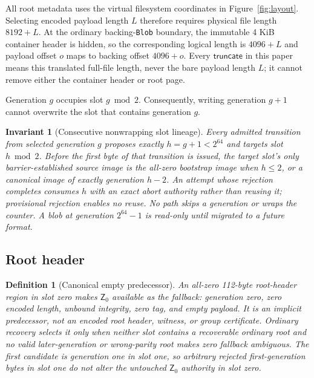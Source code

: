\documentclass[10pt,twocolumn]{article}
\newtheorem{definition}{Definition}
\newtheorem{invariant}{Invariant}
\theoremstyle{remark}
\newcommand{\code}[1]{\texttt{#1}}
\newcommand{\Zero}{\mathsf{Z}}
\begin{document}
All root metadata uses the virtual filesystem coordinates in Figure~\ref{fig:layout}. Selecting
encoded payload length $L$ therefore requires physical file length $8192+L$. At the ordinary
backing-\code{Blob} boundary, the immutable 4 KiB container header is hidden, so the corresponding
logical length is $4096+L$ and payload offset $o$ maps to backing offset $4096+o$. Every
$\mathsf{truncate}$ in this paper means this translated full-file length, never the bare payload
length $L$; it cannot remove either the container header or root page.

Generation $g$ occupies slot $g\bmod 2$. Consequently, writing generation $g+1$ cannot overwrite
the slot that contains generation $g$.

\begin{invariant}[Consecutive nonwrapping slot lineage]\label{i:lineage}
Every admitted transition from selected generation $g$ proposes exactly $h=g+1<2^{64}$ and targets
slot $h\bmod2$. Before the first byte of that transition is issued, the target slot's only
barrier-established source image is the all-zero bootstrap image when $h\le2$, or a canonical image
of exactly generation $h-2$. An attempt whose rejection completes consumes $h$ with an exact abort
authority rather than reusing it; provisional rejection enables no reuse. No path skips a
generation or wraps the counter. A blob at generation
$2^{64}-1$ is read-only until migrated to a future format.
\end{invariant}

\subsection{Root header}

\begin{definition}[Canonical empty predecessor]\label{def:zero}
An all-zero 112-byte root-header region in slot zero makes $\Zero_0$ available as the fallback:
generation zero, zero encoded length, unbound integrity, zero tag, and empty payload. It is an
implicit predecessor, not an encoded root header, witness, or group certificate. Ordinary recovery
selects it only when neither slot contains a recoverable ordinary root and no valid later-generation
or wrong-parity root makes zero fallback ambiguous. The first candidate is generation one in slot
one, so arbitrary rejected first-generation bytes in slot one do not alter the untouched
$\Zero_0$ authority in slot zero.
\end{definition}
\end{document}

